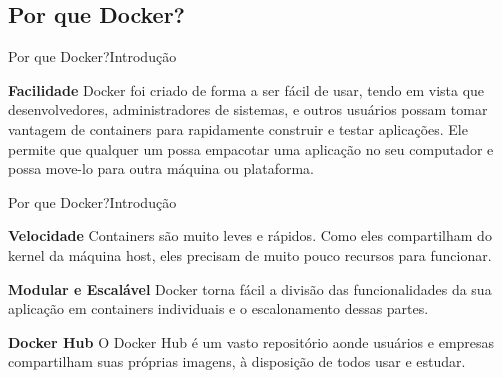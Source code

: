 \documentclass[10pt]{beamer}
\begin{document}
\subsection{Por que Docker?}
\begin{frame}{Por que Docker?}{Introdução}
    \begin{block}{\textbf{Facilidade}} 
        Docker foi criado de forma a ser fácil de usar, tendo em vista que desenvolvedores, administradores de sistemas, e outros usuários possam tomar vantagem de containers para rapidamente construir e testar aplicações. Ele permite que qualquer um possa empacotar uma aplicação no seu computador e possa move-lo para outra máquina ou plataforma.
    \end{block}
\end{frame}
\begin{frame}{Por que Docker?}{Introdução}
    \begin{block}{\textbf{Velocidade}} 
        Containers são muito leves e rápidos. Como eles compartilham do kernel da máquina host, eles precisam de muito pouco recursos para funcionar.
    \end{block}
    \pause
    \begin{block}{\textbf{Modular e Escalável}} 
        Docker torna fácil a divisão das funcionalidades da sua aplicação em containers individuais e o escalonamento dessas partes.
    \end{block}
    \pause
    \begin{block}{\textbf{Docker Hub}} 
        O Docker Hub é um vasto repositório aonde usuários e empresas compartilham suas próprias imagens, à disposição de todos usar e estudar.
    \end{block}
\end{frame}
\end{document}
